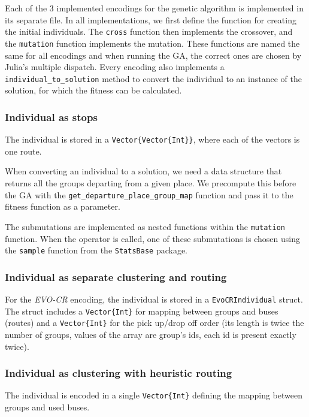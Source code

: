 Each of the 3 implemented encodings for the genetic algorithm is implemented in its separate file. In all implementations, we first define the function for creating the initial individuals. The \texttt{cross} function then implements the crossover, and the \texttt{mutation} function implements the mutation. These functions are named the same for all encodings and when running the GA, the correct ones are chosen by Julia's multiple dispatch. Every encoding also implements a \texttt{individual\_to\_solution} method to convert the individual to an instance of the solution, for which the fitness can be calculated.

\subsubsection{Individual as stops}

The individual is stored in a \texttt{Vector\{Vector\{Int\}\}}, where each of the vectors is one route.

When converting an individual to a solution, we need a data structure that returns all the groups departing from a given place. We precompute this before the GA with the \texttt{get\_departure\_place\_group\_map} function and pass it to the fitness function as a parameter.

The submutations are implemented as nested functions within the \texttt{mutation} function. When the operator is called, one of these submutations is chosen using the \texttt{sample} function from the \texttt{StatsBase} package.

\subsubsection{Individual as separate clustering and routing}

For the \textit{EVO-CR} encoding, the individual is stored in a \texttt{EvoCRIndividual} struct. The struct includes a \texttt{Vector\{Int\}} for mapping between groups and buses (routes) and a \texttt{Vector\{Int\}} for the pick up/drop off order (its length is twice the number of groups, values of the array are group's ids, each id is present exactly twice).

\subsubsection{Individual as clustering with heuristic routing}

The individual is encoded in a single \texttt{Vector\{Int\}} defining the mapping between groups and used buses.

